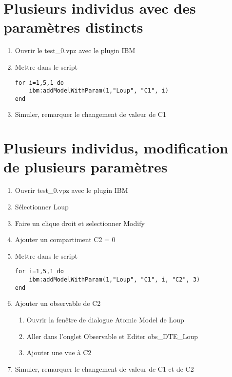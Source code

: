\documentclass[a4paper,11pt,final]{article}
\begin{document}
\section{Plusieurs individus avec des paramètres distincts} 
\begin{enumerate}
	  \item Ouvrir le test\_0.vpz avec le plugin IBM
	  \item Mettre dans le script 
	  \begin{lstlisting}[frame=single]
for i=1,5,1 do
	ibm:addModelWithParam(1,"Loup", "C1", i)
end
\end{lstlisting}
	\item Simuler, remarquer le changement de valeur de C1
\end{enumerate}

\section{Plusieurs individus, modification de plusieurs paramètres} 
\begin{enumerate}
	  \item Ouvrir test\_0.vpz avec le plugin IBM
	\item Sélectionner Loup
	\item Faire un clique droit et selectionner Modify
	\item Ajouter un compartiment C2 = 0
	\item Mettre dans le script 
\begin{lstlisting}[frame=single]
for i=1,5,1 do
	ibm:addModelWithParam(1,"Loup", "C1", i, "C2", 3)
end
\end{lstlisting}
\item Ajouter un observable de C2
\begin{enumerate}
	  \item Ouvrir la fenêtre de dialogue Atomic Model de Loup
	  \item Aller dans l'onglet Observable et Editer obs\_DTE\_Loup
	  \item Ajouter une vue à C2
\end{enumerate}
\item Simuler, remarquer le changement de valeur de C1 et de C2
\end{enumerate}
\end{document}
